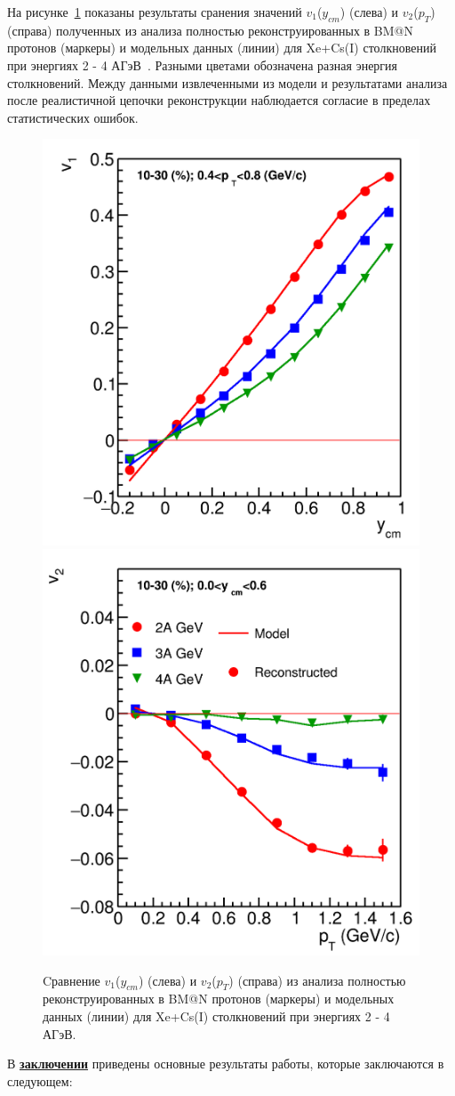 На рисунке~\ref{fig:bmn_v1_v2} показаны результаты сранения значений  $v_1$($y_{cm}$) (слева) и $v_2$($p_{T}$) (справа) полученных  из анализа полностью реконструированных в BM@N протонов (маркеры) и 
модельных данных (линии) для Xe+Cs(I) столкновений при энергиях 2 - 4 АГэВ~\cite{Mamaev:2023yhz,Mamaev:2024}. 
Разными цветами обозначена разная энергия столкновений. 
Между данными извлеченными из модели и результатами анализа после реалистичной цепочки реконструкции наблюдается согласие в пределах статистических ошибок. 
%
\begin{figure}[h]
\begin{center}
\includegraphics[width=0.4\linewidth]{images/v1_proton_tof_rapidity.png}
\includegraphics[width=0.4\linewidth]{images/v2_proton_tof_pT.png}
\caption{Cравнение  $v_1$($y_{cm}$) (слева) и $v_2$($p_{T}$) (справа) из анализа полностью реконструированных в BM@N протонов (маркеры) и 
модельных данных (линии) для Xe+Cs(I) столкновений при энергиях 2 - 4 АГэВ. }
\label{fig:bmn_v1_v2}
\end{center}
\end{figure}

В \underline{\textbf{заключении}} приведены основные результаты работы, которые заключаются в следующем:



